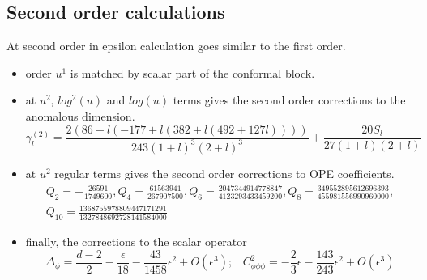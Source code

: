             \subsection{Second order calculations}  
             At second order in epsilon calculation goes similar to the first order. 
             \begin{itemize}
                 \item order $u^1$ is matched by scalar part of the conformal block.
                 \item at $u^2$, $log^2(u)$ and $log(u)$ terms gives the second order corrections to the anomalous dimension.
                 \begin{equation}
                     \gamma_l^{(2)} = \frac{2(86-l(-177+l(382+l(492+127l))))}{243(1+l)^3(2+l)^3} + \frac{20S_l}{27(1+l)(2+l)}
                 \end{equation}
                 \item at $u^2$ regular terms gives the second order corrections to OPE coefficients.
                 \begin{multline}
                    Q_2 = -\tfrac{26591}{1749600}, Q_4 = \tfrac{61563941}{267907500},Q_6 = \tfrac{2047344914778847}{4123293433459200},Q_8 = \tfrac{349552895612696393}{455981556990960000},\\Q_{10} = \tfrac{1368755978809447171291}{1327848692728141584000}
                \end{multline}
                \item finally, the  corrections to the scalar operator
                \begin{equation}
                    \Delta_{\phi} = \frac{d-2}{2}-\frac{\epsilon}{18}-\frac{43}{1458}\epsilon^2 + O(\epsilon^3);\hspace{10pt}C_{\phi\phi\phi}^2 = - \frac{2}{3}\epsilon-\frac{143}{243}\epsilon^2 + O(\epsilon^3)
                \end{equation}
             \end{itemize}
        
